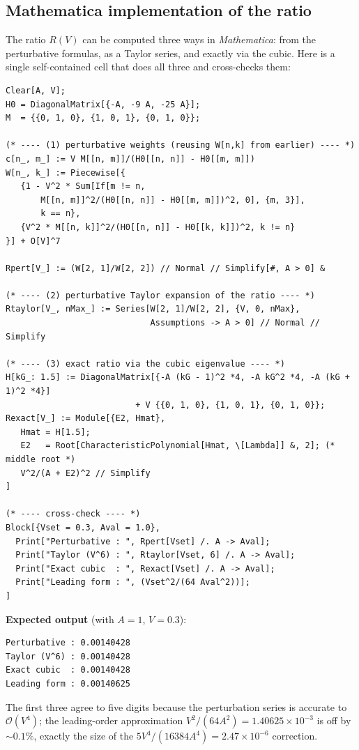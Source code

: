 \documentclass[11pt]{article}
\begin{document}
\subsection{Mathematica implementation of the ratio}

The ratio $R(V)$ can be computed three ways in \emph{Mathematica}: from the perturbative formulas, as a Taylor series, and exactly via the cubic. Here is a single self-contained cell that does all three and cross-checks them:

\begin{verbatim}
Clear[A, V];
H0 = DiagonalMatrix[{-A, -9 A, -25 A}];
M  = {{0, 1, 0}, {1, 0, 1}, {0, 1, 0}};

(* ---- (1) perturbative weights (reusing W[n,k] from earlier) ---- *)
c[n_, m_] := V M[[n, m]]/(H0[[n, n]] - H0[[m, m]])
W[n_, k_] := Piecewise[{
   {1 - V^2 * Sum[If[m != n,
       M[[n, m]]^2/(H0[[n, n]] - H0[[m, m]])^2, 0], {m, 3}],
       k == n},
   {V^2 * M[[n, k]]^2/(H0[[n, n]] - H0[[k, k]])^2, k != n}
}] + O[V]^7

Rpert[V_] := (W[2, 1]/W[2, 2]) // Normal // Simplify[#, A > 0] &

(* ---- (2) perturbative Taylor expansion of the ratio ---- *)
Rtaylor[V_, nMax_] := Series[W[2, 1]/W[2, 2], {V, 0, nMax},
                             Assumptions -> A > 0] // Normal // Simplify

(* ---- (3) exact ratio via the cubic eigenvalue ---- *)
H[kG_: 1.5] := DiagonalMatrix[{-A (kG - 1)^2 *4, -A kG^2 *4, -A (kG + 1)^2 *4}]
                          + V {{0, 1, 0}, {1, 0, 1}, {0, 1, 0}};
Rexact[V_] := Module[{E2, Hmat},
   Hmat = H[1.5];
   E2   = Root[CharacteristicPolynomial[Hmat, \[Lambda]] &, 2]; (* middle root *)
   V^2/(A + E2)^2 // Simplify
]

(* ---- cross-check ---- *)
Block[{Vset = 0.3, Aval = 1.0},
  Print["Perturbative : ", Rpert[Vset] /. A -> Aval];
  Print["Taylor (V^6) : ", Rtaylor[Vset, 6] /. A -> Aval];
  Print["Exact cubic  : ", Rexact[Vset] /. A -> Aval];
  Print["Leading form : ", (Vset^2/(64 Aval^2))];
]
\end{verbatim}

\textbf{Expected output} (with $A = 1$, $V = 0.3$):
\begin{verbatim}
Perturbative : 0.00140428
Taylor (V^6) : 0.00140428
Exact cubic  : 0.00140428
Leading form : 0.00140625
\end{verbatim}
The first three agree to five digits because the perturbation series is accurate to $\mathcal O(V^4)$; the leading-order approximation $V^2/(64 A^2) = 1.40625\times 10^{-3}$ is off by $\sim 0.1\%$, exactly the size of the $5V^4/(16384 A^4) = 2.47\times 10^{-6}$ correction.
\end{document}
